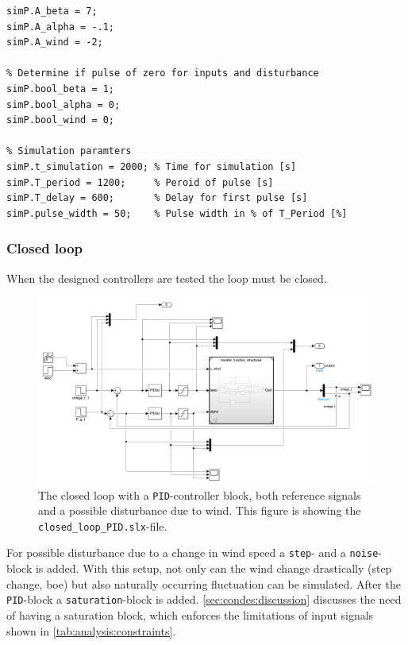 \begin{lstlisting}[style=Matlab-editor,caption={Setting flags for different combination of input pulses.},captionpos=b,label={list:condes:implementation:flags}]
% Setting amplitudes for pulse
simP.A_beta = 7;
simP.A_alpha = -.1;
simP.A_wind = -2;

% Determine if pulse of zero for inputs and disturbance
simP.bool_beta = 1;
simP.bool_alpha = 0;
simP.bool_wind = 0;

% Simulation paramters
simP.t_simulation = 2000; % Time for simulation [s]
simP.T_period = 1200;     % Peroid of pulse [s]
simP.T_delay = 600;       % Delay for first pulse [s]
simP.pulse_width = 50;    % Pulse width in % of T_Period [%]
\end{lstlisting}


\subsubsection*{Closed loop} \label{sec:condes:implementation_simulink:closed_loop}

When the designed controllers are tested the loop must be closed.

\begin{figure}[H]
    \center
    \includegraphics[width=1\textwidth,scale=1,trim=0 0 0 0,clip]{fig/Simulink/simulink_closed_loop.png}
    \caption{The closed loop with a \texttt{PID}-controller block, both reference signals and a possible disturbance due to wind. This figure is showing the \texttt{closed\_loop\_PID.slx}-file.}
    \label{fig:condes:implementation:closedloop}
\end{figure}

For possible disturbance due to a change in wind speed a \texttt{step}- and a \texttt{noise}-block is added.
With this setup, not only can the wind change drastically (step change, boe) but also naturally occurring fluctuation can be simulated.
After the \texttt{PID}-block a \texttt{saturation}-block is added.
\autoref{sec:condes:discussion} discusses the need of having a saturation block, which enforces the limitations of input signals shown in \autoref{tab:analysis:constraints}.
